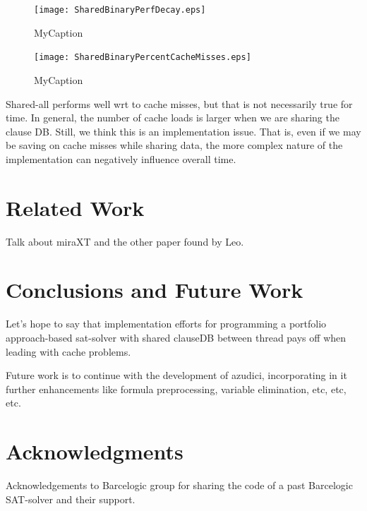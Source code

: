 \documentclass{llncs}
\begin{document}
\begin{minipage}[h]{.5\linewidth}
  \begin{figure}[htp]
    \centering
    \texttt{[image: SharedBinaryPerfDecay.eps]}
    \caption{MyCaption}
    \label{fig:MyLabel}
  \end{figure}
  \begin{figure}[htp]
    \centering
    \texttt{[image: SharedBinaryPercentCacheMisses.eps]}
    \caption{MyCaption}
    \label{fig:MyLabel}
  \end{figure}
\end{minipage}

Shared-all performs well wrt to cache misses, but that is not
necessarily true for time. In general, the number of cache loads is
larger when we are sharing the clause DB. Still, we think this is an
implementation issue. That is, even if we may be saving on cache
misses while sharing data, the more complex nature of the
implementation can negatively influence overall time.



\section{Related Work}

Talk about miraXT and the other paper found by Leo.

\section{Conclusions and Future Work}

Let's hope to say that implementation efforts for programming a
portfolio approach-based sat-solver with shared clauseDB between
thread pays off when leading with cache problems.

Future work is to continue with the development of  azudici,
incorporating in it further enhancements like formula preprocessing,
variable elimination, etc, etc, etc.

\section*{Acknowledgments}

Acknowledgements to Barcelogic group for sharing the code of a past
Barcelogic SAT-solver and their support.




\end{document}

